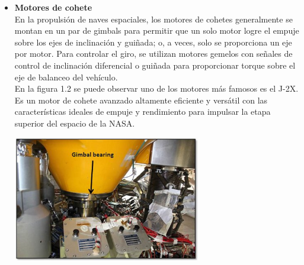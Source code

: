 \begin{itemize}
	\item \textbf{Motores de cohete}\\
		  En la propulsión de naves espaciales, los motores de cohetes generalmente se
		  montan en un par de gimbals para permitir que un solo motor logre el empuje
		  sobre los ejes de inclinación y guiñada; o, a veces, solo se proporciona un eje
		  por motor. Para controlar el giro, se utilizan motores gemelos con señales de
		  control de inclinación diferencial o guiñada para proporcionar torque sobre el
		  eje de balanceo del vehículo.\\
		  En la figura 1.2 se puede observar uno de los motores más famosos es el J-2X. Es un motor de cohete avanzado altamente
		  eficiente y versátil con las características ideales de empuje y rendimiento para
		  impulsar la etapa superior del espacio de la NASA.\cite{WEB:NASA}
	      \begin{center}
		      \includegraphics[width=0.65\textwidth]{Contenido/Cuerpo/Capitulo1/Fig2.eps}
		      \label{fig:Introduccion:Fig3}
	      \end{center}


\end{itemize}
